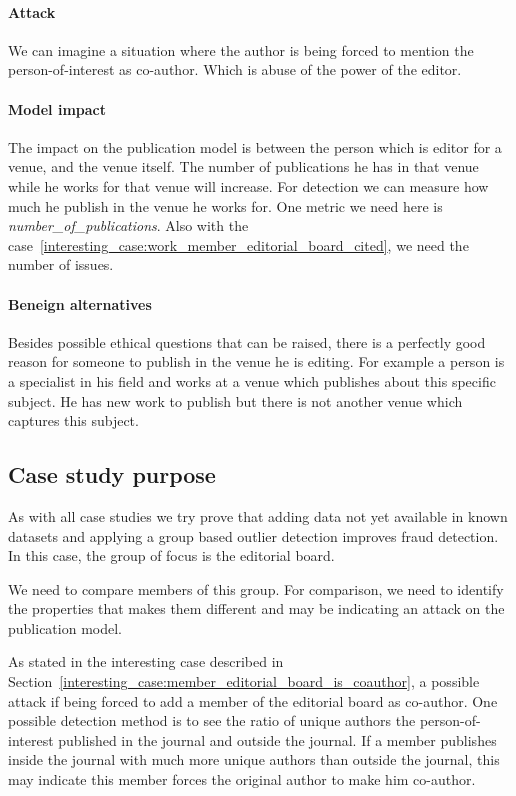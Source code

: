 \documentclass{ou-report}
\begin{document}
\paragraph{Attack}
We can imagine a situation where the author is being forced to mention the 
person-of-interest as co-author. Which is abuse of the power of the editor.

\paragraph{Model impact}
The impact on the publication model is between the person which is \mbox{editor} for a 
venue, and the venue itself. 
The number of publications he has in that venue while he works for that venue 
will increase. For detection we can measure how much he publish in the venue 
he works for.
One metric we need here is \textit{number\_of\_publications}. Also with the 
case~\ref{interesting_case:work_member_editorial_board_cited}, we need the 
number of issues.

\paragraph{Beneign alternatives}
Besides possible ethical questions that can be raised, there is a perfectly good
reason for someone to publish in the venue he is editing. For example a person
is a 
specialist in his field and works at a venue which publishes about this 
specific subject. He has new work to publish but there is not another venue 
which captures this subject.

\subsection{Case study purpose}
\label{subsec:case2_purpose}
As with all case studies we try prove that adding data not yet available in
known datasets and applying a group based outlier 
detection improves fraud detection. In this case, the group
of focus is the editorial board.

We need to compare members of this group. For comparison, we need to identify
the properties that makes them different and may be indicating an attack on the
publication model.

As stated in the interesting case described in 
Section~\ref{interesting_case:member_editorial_board_is_coauthor}, a 
possible attack if being forced 
to add a member of the editorial board as co-author. One possible detection 
method is to see the ratio of unique authors the person-of-interest published
in the journal and outside the journal. If a member publishes inside the journal
with much more unique authors than outside the journal, this may indicate this 
member forces the original author to make him co-author.
\end{document}
